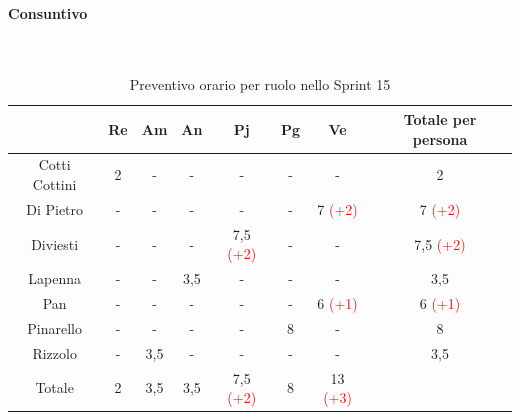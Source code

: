 \documentclass{article}
\begin{document}
                \paragraph{Consuntivo}\mbox{}\\
                \begin{table}[H]
                    \centering
                    \begin{tabular}{|c|c|c|c|c|c|c|c|}
                    \hline
                                  & Re  & Am  & An  & Pj  & Pg  & Ve  & Totale per persona \\ \hline
                    Cotti Cottini & 2   & -   & -   & -   & -   & -   & 2                  \\ \hline
                    Di Pietro     & -   & -   & -   & -   & -   & 7 \textcolor{red}{(+2)}   & 7 \textcolor{red}{(+2)}                  \\ \hline
                    Diviesti      & -   & -   & -   & 7,5 \textcolor{red}{(+2)} & -   & -   & 7,5 \textcolor{red}{(+2)}                \\ \hline
                    Lapenna       & -   & -   & 3,5 & -   & -   & -   & 3,5                \\ \hline
                    Pan           & -   & -   & -   & -   & -   & 6 \textcolor{red}{(+1)}   & 6 \textcolor{red}{(+1)}                  \\ \hline
                    Pinarello     & -   & -   & -   & -   & 8  & -   & 8                 \\ \hline
                    Rizzolo       & -   & 3,5 & -   & -   & -   & -   & 3,5                \\ \hline
                    Totale        & 2   & 3,5 & 3,5 & 7,5 \textcolor{red}{(+2)} & 8  & 13 \textcolor{red}{(+3)}  &                    \\ \hline
                    \end{tabular}
                    \caption{Preventivo orario per ruolo nello Sprint 15}  
                \end{table}

\end{document}
